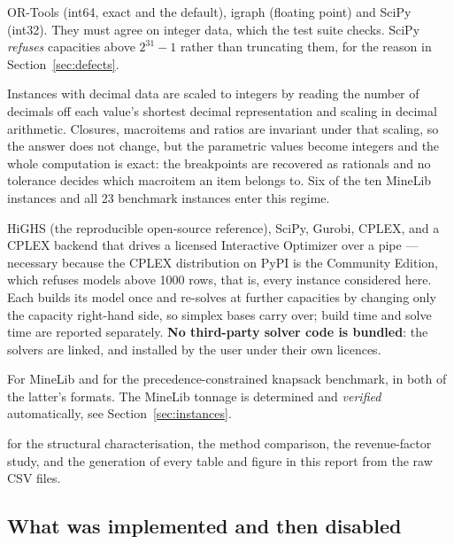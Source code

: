\documentclass[11pt,a4paper]{article}
\begin{document}
\begin{description}[leftmargin=1.4em,style=nextline]
\item[Three interchangeable maximum-flow backends.] OR-Tools (int64, exact
and the default), igraph (floating point) and SciPy (int32). They must agree
on integer data, which the test suite checks. SciPy \emph{refuses} capacities
above $2^{31}-1$ rather than truncating them, for the reason in
Section~\ref{sec:defects}.

\item[Exact arithmetic wherever the data allow it.] Instances with decimal
data are scaled to integers by reading the number of decimals off each
value's shortest decimal representation and scaling in decimal arithmetic.
Closures, macroitems and ratios are invariant under that scaling, so the
answer does not change, but the parametric values become integers and the
whole computation is exact: the breakpoints are recovered as rationals and no
tolerance decides which macroitem an item belongs to. Six of the ten MineLib
instances and all 23 benchmark instances enter this regime.

\item[Five LP baselines behind one interface.] HiGHS (the reproducible
open-source reference), SciPy, Gurobi, CPLEX, and a CPLEX backend that drives
a licensed Interactive Optimizer over a pipe --- necessary because the CPLEX
distribution on PyPI is the Community Edition, which refuses models above
1000 rows, that is, every instance considered here. Each builds its model
once and re-solves at further capacities by changing only the capacity
right-hand side, so simplex bases carry over; build time and solve time are
reported separately. \textbf{No third-party solver code is bundled}: the
solvers are linked, and installed by the user under their own licences.

\item[Instance readers.] For MineLib and for the precedence-constrained
knapsack benchmark, in both of the latter's formats. The MineLib tonnage is
determined and \emph{verified} automatically, see Section~\ref{sec:instances}.

\item[A command-line interface and experiment scripts] for the structural
characterisation, the method comparison, the revenue-factor study, and the
generation of every table and figure in this report from the raw CSV files.
\end{description}

\subsection{What was implemented and then disabled}
\end{document}
